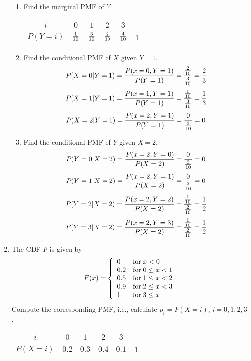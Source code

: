 \documentclass[12pt]{article}%
\newcommand{\0}{{\bf 0}}
\begin{document}
\begin{enumerate}
\begin{enumerate}
\item
Find the marginal PMF of $Y$.
\\
{\color{blue}{\bf Sol.}}
\begin{table}[H]    \center
\begin{tabular}{|c||c|c|c|c||c|} \hline
           $i$        &   $0$      &   $1$   &$2$    &$3$    &  \\
\hline 
$P(Y=i)$    & $\f{1}{10}$  & $\f{3}{10}$&$\f{2}{10}$ & $\f{4}{10}$ &1\\
\hline


\end{tabular}\vspace{3mm}
\end{table}

\item
Find the conditional PMF of $X$ given $Y=1$.
\\
{\color{blue}{\bf Sol.}}
$$P(X=0|Y=1)=\f{P(x=0,Y=1)}{P(Y=1)}=\f{\f{2}{10}}{\f{3}{10}}=\f{2}{3}$$
$$P(X=1|Y=1)=\f{P(x=1,Y=1)}{P(Y=1)}=\f{\f{1}{10}}{\f{3}{10}}=\f{1}{3}$$
$$P(X=2|Y=1)=\f{P(x=2,Y=1)}{P(Y=1)}=\f{0}{\f{3}{10}}=0$$
\item
Find the conditional PMF of $Y$ given $X=2$.
\\
{\color{blue}{\bf Sol.}}
$$P(Y=0|X=2)=\f{P(x=2,Y=0)}{P(X=2)}=\f{0}{\f{2}{10}}=0$$
$$P(Y=1|X=2)=\f{P(x=2,Y=1)}{P(X=2)}=\f{0}{\f{2}{10}}=0$$
$$P(Y=2|X=2)=\f{P(x=2,Y=2)}{P(X=2)}=\f{\f{1}{10}}{\f{2}{10}}=\f{1}{2}$$
$$P(Y=3|X=2)=\f{P(x=2,Y=3)}{P(X=2)}=\f{\f{1}{10}}{\f{2}{10}}=\f{1}{2}$$
\end{enumerate}





\item 
The CDF $F$  is given by
$$
F(x)=\left\{\ba{ll}
0&\mb{for}\ x< 0\\
0.2&\mb{for}\ 0\le x<1\\
0.5&\mb{for}\ 1\le x<2\\
0.9&\mb{for}\ 2\le x<3\\
1&\mb{for}\ 3\le x
\ea\right.
$$
Compute the corresponding PMF, i.e.,
calculate $p_i=P(X=i)$, $i=0,1,2,3$.
\\
{\color{blue}{\bf Sol.}}


\begin{table}[H]    \center
\begin{tabular}{|c||c|c|c|c||c|} \hline
           $i$        &   $0$      &   $1$   &$2$    &$3$    &  \\
\hline 
$P(X=i)$    & $0.2$  & $0.3$&$0.4$ & $0.1$ &1\\
\hline



\end{tabular}
\end{table}
\end{enumerate}
\end{document}
